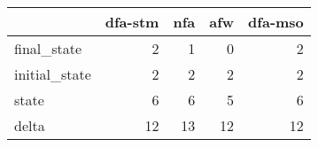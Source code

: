 \begin{tabular}{lrrrr}
\toprule
{} &  dfa-stm &  nfa &  afw &  dfa-mso \\
\midrule
final\_state   &        2 &    1 &    0 &        2 \\
initial\_state &        2 &    2 &    2 &        2 \\
state         &        6 &    6 &    5 &        6 \\
delta         &       12 &   13 &   12 &       12 \\
\bottomrule
\end{tabular}
